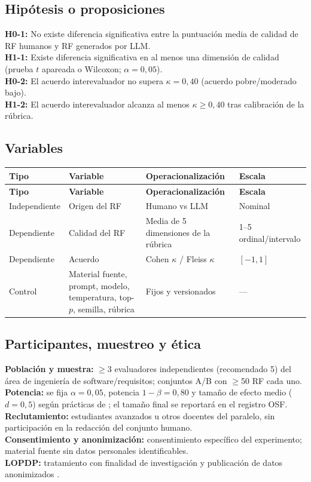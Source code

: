 \documentclass[12pt,journal,onecolumn]{IEEEtran}
\begin{document}
\subsection{Hipótesis o proposiciones}
\textbf{H0-1:} No existe diferencia significativa entre la puntuación media de calidad de RF humanos y RF generados por LLM.\\
\textbf{H1-1:} Existe diferencia significativa en al menos una dimensión de calidad (prueba $t$ apareada o Wilcoxon; $\alpha=0{,}05$).\\
\textbf{H0-2:} El acuerdo interevaluador no supera $\kappa=0{,}40$ (acuerdo pobre/moderado bajo).\\
\textbf{H1-2:} El acuerdo interevaluador alcanza al menos $\kappa\geq0{,}40$ tras calibración de la rúbrica.

\subsection{Variables}
\begin{longtable}{P{0.20\textwidth}P{0.25\textwidth}P{0.30\textwidth}P{0.18\textwidth}}\toprule
\textbf{Tipo} & \textbf{Variable} & \textbf{Operacionalización} & \textbf{Escala}\\\midrule\endfirsthead
\toprule\textbf{Tipo} & \textbf{Variable} & \textbf{Operacionalización} & \textbf{Escala}\\\midrule\endhead
Independiente & Origen del RF & Humano vs LLM & Nominal\\
Dependiente & Calidad del RF & Media de 5 dimensiones de la rúbrica & 1--5 ordinal/intervalo\\
Dependiente & Acuerdo & Cohen $\kappa$ / Fleiss $\kappa$ & $[-1,1]$\\
Control & Material fuente, prompt, modelo, temperatura, top-$p$, semilla, rúbrica & Fijos y versionados & ---\\\bottomrule
\end{longtable}

\subsection{Participantes, muestreo y ética}
\textbf{Población y muestra:} $\geq$3 evaluadores independientes (recomendado 5) del área de ingeniería de software/requisitos; conjuntos A/B con $\geq$50 RF cada uno.\\
\textbf{Potencia:} se fija $\alpha=0{,}05$, potencia $1-\beta=0{,}80$ y tamaño de efecto medio ($d=0{,}5$) según prácticas de \cite{molleri2020surveys,wohlin2012experimentation}; el tamaño final se reportará en el registro OSF.\\
\textbf{Reclutamiento:} estudiantes avanzados u otros docentes del paralelo, sin participación en la redacción del conjunto humano.\\
\textbf{Consentimiento y anonimización:} consentimiento específico del experimento; material fuente sin datos personales identificables.\\
\textbf{LOPDP:} tratamiento con finalidad de investigación y publicación de datos anonimizados \cite{lopdp2021}.
\end{document}
